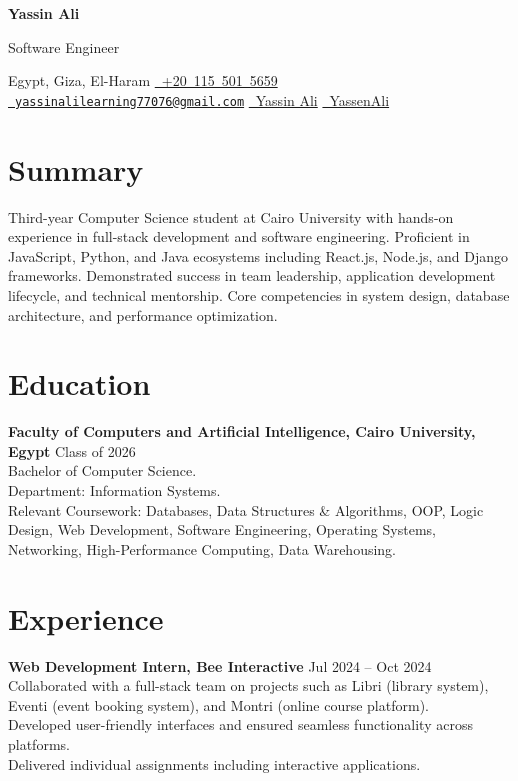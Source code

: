 \documentclass[a4paper,10pt]{article}
\begin{document}
\centerline{\Huge \textbf{Yassin Ali}}
\vspace{2mm}
\centerline{\large Software Engineer}
\vspace{2mm}
\centerline{
  Egypt, Giza, El-Haram \textbullet{}
  \href{tel:+201155015659}{\faPhone\ +20~115~501~5659} \textbullet{}
  \href{mailto:yassinalilearning77076@gmail.com}{\faEnvelope\ \texttt{yassinalilearning77076@gmail.com}} \textbullet{}
  \href{https://www.linkedin.com/in/yassin-ali-10497a252/}{\faLinkedinSquare\ Yassin Ali} \textbullet{}
  \href{https://github.com/YassenAli}{\faGithub\ YassenAli}
}


\section*{Summary}
Third-year Computer Science student at Cairo University with hands-on experience in full-stack development and software engineering. Proficient in JavaScript, Python, and Java ecosystems including React.js, Node.js, and Django frameworks. Demonstrated success in team leadership, application development lifecycle, and technical mentorship. Core competencies in system design, database architecture, and performance optimization.


\section*{Education}
\textbf{Faculty of Computers and Artificial Intelligence, Cairo University, Egypt} \hfill Class of 2026 \\
Bachelor of Computer Science. \\
Department: Information Systems. \\
Relevant Coursework: Databases, Data Structures \& Algorithms, OOP, Logic Design, Web Development, Software Engineering, Operating Systems, Networking, High-Performance Computing, Data Warehousing.


\section*{Experience}
\textbf{Web Development Intern, Bee Interactive} \hfill Jul 2024 -- Oct 2024 \\
\textbullet{}\hspace{2mm} Collaborated with a full-stack team on projects such as Libri (library system), Eventi (event booking system), and Montri (online course platform).  \\
\textbullet{}\hspace{2mm} Developed user-friendly interfaces and ensured seamless functionality across platforms.  \\
\textbullet{}\hspace{2mm} Delivered individual assignments including interactive applications.
\end{document}
